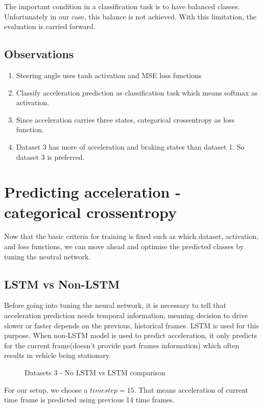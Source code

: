 The important condition in a classification task is to have balanced classes.
Unfortunately in our case, this balance is not achieved. With this limitation, the
evaluation is carried forward.

\subsection{Observations}
\begin{enumerate}
    \item Steering angle uses tanh activation and MSE loss functions
    \item Classify acceleration prediction as classification task which means softmax as
        activation.
    \item Since acceleration carries three states, categorical crossentropy as loss
        function.
    \item Dataset 3 has more of acceleration and braking states than dataset 1. So dataset
        3 is preferred.
\end{enumerate}
\section{Predicting acceleration - categorical crossentropy}
\label{chapter5sec:cce}
Now that the basic criteria for training is fixed such as which dataset, activation, and
loss functions, we can move ahead and optimise the predicted classes by tuning the
neutral network.

\subsection*{LSTM vs Non-LSTM}
Before going into tuning the neural network, it is necessary to tell that acceleration
prediction needs temporal information; meaning decision to drive slower or faster depends
on the previous, historical frames. LSTM is used for this purpose. When non-LSTM model is used
to predict acceleration, it only predicts for the current frame(doesn't provide past
frames information) which often results in vehicle being stationary.
\begin{figure}[!ht]
    \centering
    \def\svgwidth{0.9\textwidth}
    
    \caption{Datasets 3 - No LSTM vs LSTM comparison}
    \label{fig:ds3nolstmvslstm}
\end{figure}
For our setup, we choose a $timestep = 15$. That means acceleration of current time frame
is predicted using previous 14 time frames.
